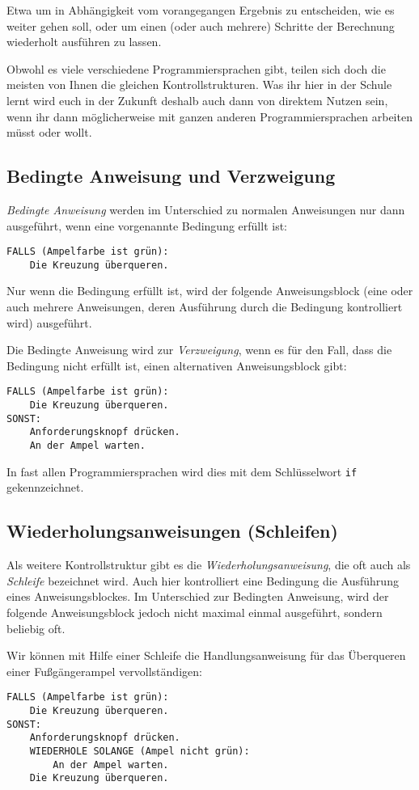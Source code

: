 Etwa um in Abhängigkeit vom vorangegangen Ergebnis zu entscheiden, wie es weiter
gehen soll, oder um einen (oder auch mehrere) Schritte der Berechnung wiederholt
ausführen zu lassen.

Obwohl es viele verschiedene Programmiersprachen gibt, teilen sich doch die
meisten von Ihnen die gleichen Kontrollstrukturen. Was ihr hier in der Schule
lernt wird euch in der Zukunft deshalb auch dann von direktem Nutzen sein, wenn
ihr dann möglicherweise mit ganzen anderen Programmiersprachen arbeiten müsst oder
wollt.


\subsection{Bedingte Anweisung und Verzweigung}

\emph{Bedingte Anweisung} werden im Unterschied zu normalen Anweisungen nur dann
ausgeführt, wenn eine vorgenannte Bedingung erfüllt ist:

\begin{lstlisting}
FALLS (Ampelfarbe ist grün):
    Die Kreuzung überqueren.
\end{lstlisting}

Nur wenn die Bedingung erfüllt ist, wird der folgende Anweisungsblock (eine
oder auch mehrere Anweisungen, deren Ausführung durch die Bedingung
kontrolliert wird) ausgeführt.

Die Bedingte Anweisung wird zur \emph{Verzweigung}, wenn es für den Fall, dass
die Bedingung nicht erfüllt ist, einen alternativen Anweisungsblock gibt:

\begin{lstlisting}
FALLS (Ampelfarbe ist grün):
    Die Kreuzung überqueren.
SONST:
    Anforderungsknopf drücken.
    An der Ampel warten.
\end{lstlisting}

In fast allen Programmiersprachen wird dies mit dem Schlüsselwort \lstinline|if|
gekennzeichnet.


\subsection{Wiederholungsanweisungen (Schleifen)}

Als weitere Kontrollstruktur gibt es die \emph{Wiederholungsanweisung}, die oft
auch als \emph{Schleife} bezeichnet wird. Auch hier kontrolliert eine Bedingung
die Ausführung eines Anweisungsblockes. Im Unterschied zur Bedingten Anweisung,
wird der folgende Anweisungsblock jedoch nicht maximal einmal ausgeführt,
sondern beliebig oft.

Wir können mit Hilfe einer Schleife die Handlungsanweisung für das Überqueren
einer Fußgängerampel vervollständigen:

\begin{lstlisting}
FALLS (Ampelfarbe ist grün):
    Die Kreuzung überqueren.
SONST:
    Anforderungsknopf drücken.
    WIEDERHOLE SOLANGE (Ampel nicht grün):
        An der Ampel warten.
    Die Kreuzung überqueren.
\end{lstlisting}